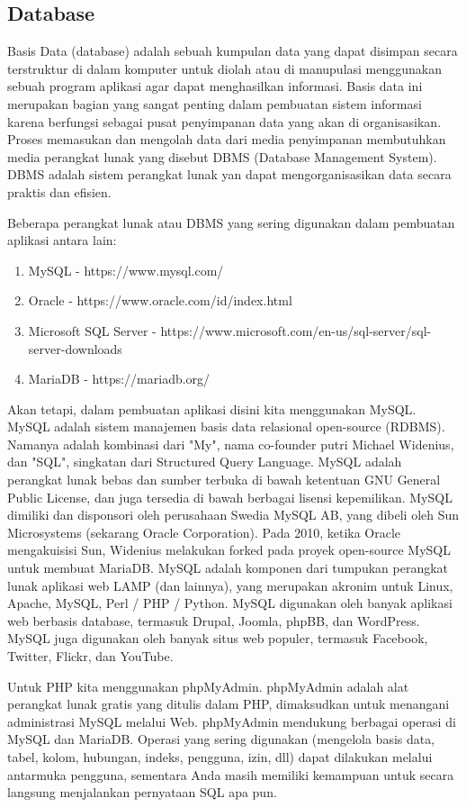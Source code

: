 \subsection{Database}
Basis Data (database) adalah sebuah kumpulan data yang dapat disimpan secara terstruktur di dalam komputer untuk diolah atau di manupulasi menggunakan sebuah program aplikasi agar dapat menghasilkan informasi. Basis data ini merupakan bagian yang sangat penting dalam pembuatan sistem informasi karena berfungsi sebagai pusat penyimpanan data yang akan di organisasikan. Proses memasukan dan mengolah data dari media penyimpanan membutuhkan media perangkat lunak yang disebut DBMS (Database Management System). DBMS adalah sistem perangkat lunak yan dapat mengorganisasikan data secara praktis dan efisien.
\par
Beberapa perangkat lunak atau DBMS yang sering digunakan dalam pembuatan aplikasi antara lain:
\begin{enumerate}
\item MySQL - https://www.mysql.com/
\item Oracle - https://www.oracle.com/id/index.html
\item Microsoft SQL Server - https://www.microsoft.com/en-us/sql-server/sql-server-downloads
\item MariaDB - https://mariadb.org/
\end{enumerate}
Akan tetapi, dalam pembuatan aplikasi disini kita menggunakan MySQL.
\newline
MySQL adalah sistem manajemen basis data relasional open-source (RDBMS). Namanya adalah kombinasi dari "My", nama co-founder putri Michael Widenius, dan "SQL", singkatan dari Structured Query Language. MySQL adalah perangkat lunak bebas dan sumber terbuka di bawah ketentuan GNU General Public License, dan juga tersedia di bawah berbagai lisensi kepemilikan. MySQL dimiliki dan disponsori oleh perusahaan Swedia MySQL AB, yang dibeli oleh Sun Microsystems (sekarang Oracle Corporation). Pada 2010, ketika Oracle mengakuisisi Sun, Widenius melakukan forked pada proyek open-source MySQL untuk membuat MariaDB. MySQL adalah komponen dari tumpukan perangkat lunak aplikasi web LAMP (dan lainnya), yang merupakan akronim untuk Linux, Apache, MySQL, Perl / PHP / Python. MySQL digunakan oleh banyak aplikasi web berbasis database, termasuk Drupal, Joomla, phpBB, dan WordPress. MySQL juga digunakan oleh banyak situs web populer, termasuk Facebook, Twitter, Flickr, dan YouTube. 
\par
Untuk PHP kita menggunakan phpMyAdmin. phpMyAdmin adalah alat perangkat lunak gratis yang ditulis dalam PHP, dimaksudkan untuk menangani administrasi MySQL melalui Web. phpMyAdmin mendukung berbagai operasi di MySQL dan MariaDB. Operasi yang sering digunakan (mengelola basis data, tabel, kolom, hubungan, indeks, pengguna, izin, dll) dapat dilakukan melalui antarmuka pengguna, sementara Anda masih memiliki kemampuan untuk secara langsung menjalankan pernyataan SQL apa pun.

